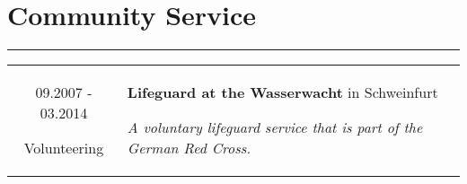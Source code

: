 \documentclass[10pt]{article}
\begin{document}
\section*{Community Service}
\vspace{-0.3cm}
{\color{E6E6E6} \hrule height 0.04cm}
\vspace{0.4cm}
\renewcommand{\arraystretch}{1.0}
\begin{tabular}{C Z D}
	{
		09.2007 - 03.2014
		
		\vspace{-0.05cm}
		
		{\scriptsize Volunteering}
	}
	&
	{
		{\bf Lifeguard at the Wasserwacht} {\scriptsize in Schweinfurt}
		
		\vspace{0.05cm}
		
		{\scriptsize \it A voluntary lifeguard service that is part of the German Red Cross.}
	}
	\\
\end{tabular}
\end{document}
